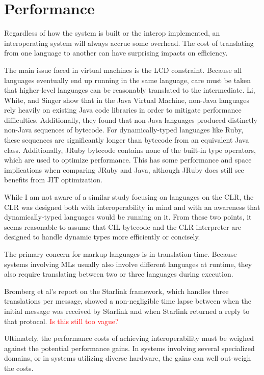 \documentclass{sig-alternate}
\newcommand{\mycomment}[1]{\textcolor{red}{#1}}
\begin{document}
\section{Performance} \label{performance}
Regardless of how the system is built or the interop implemented, an interoperating system will always accrue some overhead. The cost of translating from one language to another can have surprising impacts on efficiency. 

The main issue faced in virtual machines is the LCD constraint. Because all languages eventually end up running in the same language, care must be taken that higher-level languages can be reasonably translated to the intermediate.
Li, White, and Singer \cite{Li:2013} show that in the Java Virtual Machine, non-Java languages rely heavily on existing Java code libraries in order to mitigate performance difficulties. Additionally, they found that non-Java languages produced distinctly non-Java sequences of bytecode.
For dynamically-typed languages like Ruby, these sequences are significantly longer than bytecode from an equivalent Java class. Additionally, JRuby bytecode contains none of the built-in type operators, which are used to optimize performance. This has some performance and space implications when comparing JRuby and Java, although JRuby does still see benefits from JIT optimization.


While I am not aware of a similar study focusing on languages on the CLR, the CLR was designed both with interoperability in mind and with an awareness that dynamically-typed languages would be running on it. From these two points, it seems reasonable to assume that CIL bytecode and the CLR interpreter are designed to handle dynamic types more efficiently or concisely.


The primary concern for markup languages is in translation time. Because systems involving MLs usually also involve different languages at runtime, they also require translating between two or three languages during execution.

Bromberg et al's report on the Starlink framework, which handles three translations per message, showed a non-negligible time lapse between when the initial message was received by Starlink and when Starlink returned a reply to that protocol.
\mycomment{Is this still too vague?}

Ultimately, the performance costs of achieving interoperability must be weighed against the potential performance gains. In systems involving several specialized domains, or in systems utilizing diverse hardware, the gains can well out-weigh the costs.
\end{document}
